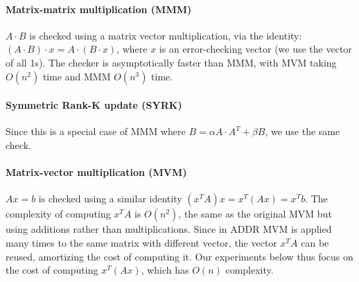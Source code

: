 \documentclass[10pt, conference, compsocconf]{IEEEtran}
\begin{document}
\paragraph{Matrix-matrix multiplication (MMM)}
$A \cdot B$ is checked using a matrix vector multiplication, via the identity: $(A \cdot B) \cdot x = A \cdot (B \cdot x)$, where $x$ is an error-checking vector (we use the vector of all 1s).
The checker is asymptotically faster than MMM, with MVM taking $O(n^2)$ time and MMM $O(n^3)$ time.

\paragraph{Symmetric Rank-K update (SYRK)}
Since this is a special case of MMM where $B = \alpha A \cdot A^T + \beta B$, %
we use the same check.

\paragraph{Matrix-vector multiplication (MVM)}
$Ax=b$ is checked using a similar identity $(x^TA)x = x^T(Ax) = x^Tb$.
The complexity of computing $x^TA$ is $O(n^2)$, the same as the original MVM but using additions rather than multiplications.
Since in ADDR MVM is applied many times to the same matrix with different vector, the vector $x^TA$ can be reused, amortizing the cost of computing it.
Our experiments below thus focus on the cost of computing $x^T(Ax)$, which has $O(n)$ complexity.
\end{document}
